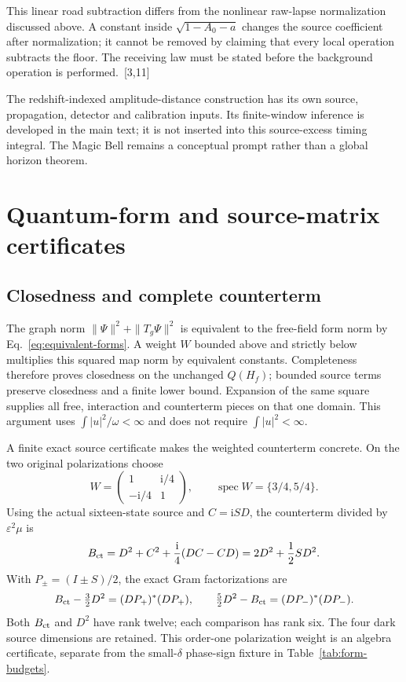 \documentclass[10pt,twocolumn,letterpaper]{article}
\newcommand{\ii}{\mathrm{i}}
\begin{document}
This linear road subtraction differs from the nonlinear raw-lapse normalization discussed above. A constant inside $\sqrt{1-A_0-a}$ changes the source coefficient after normalization; it cannot be removed by claiming that every local operation subtracts the floor. The receiving law must be stated before the background operation is performed.~[3,11]

The redshift-indexed amplitude-distance construction has its own source, propagation, detector and calibration inputs. Its finite-window inference is developed in the main text; it is not inserted into this source-excess timing integral. The Magic Bell remains a conceptual prompt rather than a global horizon theorem.

\section{Quantum-form and source-matrix certificates}\label{app:form-proof}
\subsection{Closedness and complete counterterm}
The graph norm $\|\Psi\|^2+\|T_g\Psi\|^2$ is equivalent to the free-field form norm by Eq.~\eqref{eq:equivalent-forms}. A weight $W$ bounded above and strictly below multiplies this squared map norm by equivalent constants. Completeness therefore proves closedness on the unchanged $Q(H_f)$; bounded source terms preserve closedness and a finite lower bound. Expansion of the same square supplies all free, interaction and counterterm pieces on that one domain. This argument uses $\int|u|^2/\omega<\infty$ and does not require $\int|u|^2<\infty$.

A finite exact source certificate makes the weighted counterterm concrete. On the two original polarizations choose
\[
 W=\begin{pmatrix}1&\ii/4\\-\ii/4&1\end{pmatrix},\qquad
 \operatorname{spec}W=\{3/4,5/4\}.
\]
Using the actual sixteen-state source and $C=\ii SD$, the counterterm divided by $\varepsilon^2\mu$ is
\[
 B_{\rm ct}=D^2+C^2+\frac{\ii}4(DC-CD)
 =2D^2+\frac 12SD^2.
\]
With $P_\pm=(I\pm S)/2$, the exact Gram factorizations are
\[
 B_{\rm ct}-\tfrac 32D^2=(DP_+)^*(DP_+),\qquad
 \tfrac 52D^2-B_{\rm ct}=(DP_-)^*(DP_-).
\]
Both $B_{\rm ct}$ and $D^2$ have rank twelve; each comparison has rank six. The four dark source dimensions are retained. This order-one polarization weight is an algebra certificate, separate from the small-$\delta$ phase-sign fixture in Table~\ref{tab:form-budgets}.
\end{document}
